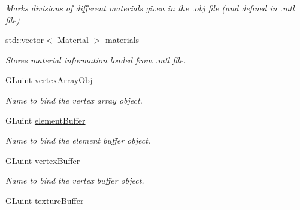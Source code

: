 \begin{DoxyCompactItemize}
\begin{DoxyCompactList}\small\item\em Marks divisions of different materials given in the .obj file (and defined in .mtl file) \end{DoxyCompactList}\item 
std\+::vector$<$ Material $>$ \hyperlink{class_obj_g_p_u_data_acfdaa154dbbb2b23512b4f65ec1ac708}{materials}\hypertarget{class_obj_g_p_u_data_acfdaa154dbbb2b23512b4f65ec1ac708}{}\label{class_obj_g_p_u_data_acfdaa154dbbb2b23512b4f65ec1ac708}

\begin{DoxyCompactList}\small\item\em Stores material information loaded from .mtl file. \end{DoxyCompactList}\item 
G\+Luint \hyperlink{class_obj_g_p_u_data_a723846f0ce483bd69094834e18e17e13}{vertex\+Array\+Obj}\hypertarget{class_obj_g_p_u_data_a723846f0ce483bd69094834e18e17e13}{}\label{class_obj_g_p_u_data_a723846f0ce483bd69094834e18e17e13}

\begin{DoxyCompactList}\small\item\em Name to bind the vertex array object. \end{DoxyCompactList}\item 
G\+Luint \hyperlink{class_obj_g_p_u_data_a64363bc12d8082f77948946d2542a89b}{element\+Buffer}\hypertarget{class_obj_g_p_u_data_a64363bc12d8082f77948946d2542a89b}{}\label{class_obj_g_p_u_data_a64363bc12d8082f77948946d2542a89b}

\begin{DoxyCompactList}\small\item\em Name to bind the element buffer object. \end{DoxyCompactList}\item 
G\+Luint \hyperlink{class_obj_g_p_u_data_ac89933479b0d8929860ee7317a4bdfdf}{vertex\+Buffer}\hypertarget{class_obj_g_p_u_data_ac89933479b0d8929860ee7317a4bdfdf}{}\label{class_obj_g_p_u_data_ac89933479b0d8929860ee7317a4bdfdf}

\begin{DoxyCompactList}\small\item\em Name to bind the vertex buffer object. \end{DoxyCompactList}\item 
G\+Luint \hyperlink{class_obj_g_p_u_data_aa35cf8a237a4b9a84156c880b534214a}{texture\+Buffer}\hypertarget{class_obj_g_p_u_data_aa35cf8a237a4b9a84156c880b534214a}{}\label{class_obj_g_p_u_data_aa35cf8a237a4b9a84156c880b534214a}


\end{DoxyCompactItemize}
